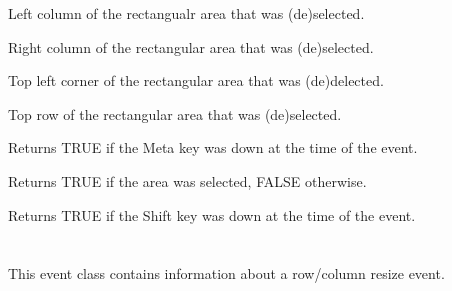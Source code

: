 
Left column of the rectangualr area that was (de)selected.

\label{wxgridrangeselecteventgetrightcol}


Right column of the rectangular area that was (de)selected.

\label{wxgridrangeselecteventgettopleftcoords}


Top left corner of the rectangular area that was (de)delected.

\label{wxgridrangeselecteventgettoprow}


Top row of the rectangular area that was (de)selected.

\label{wxgridrangeselecteventmetadown}


Returns TRUE if the Meta key was down at the time of the event.

\label{wxgridrangeselecteventselecting}


Returns TRUE if the area was selected, FALSE otherwise.

\label{wxgridrangeselecteventshiftdown}


Returns TRUE if the Shift key was down at the time of the event.

\section{}\label{wxgridsizeevent}

This event class contains information about a row/column resize event.


\\
\\
\\

